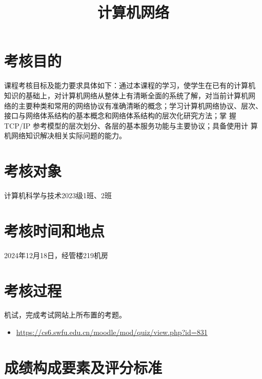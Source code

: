 \documentclass{swfuassessment}
\title{计算机网络}
\begin{document}
\headone{}

\section{考核目的}

课程考核目标及能力要求具体如下：通过本课程的学习，使学生在已有的计算机
知识的基础上，对计算机网络从整体上有清晰全面的系统了解，对当前计算机网
络的主要种类和常用的网络协议有准确清晰的概念；学习计算机网络协议、层次、
接口与网络体系结构的基本概念和网络体系结构的层次化研究方法；掌
握 TCP/IP 参考模型的层次划分、各层的基本服务功能与主要协议；具备使用计
算机网络知识解决相关实际问题的能力。

\section{考核对象}

计算机科学与技术2023级1班、2班

\section{考核时间和地点}

2024年12月18日，经管楼219机房

\section{考核过程}

机试，完成考试网站上所布置的考题。

\begin{itemize}
\item \url{https://cs6.swfu.edu.cn/moodle/mod/quiz/view.php?id=831}
\end{itemize}

\section{成绩构成要素及评分标准}
\end{document}
